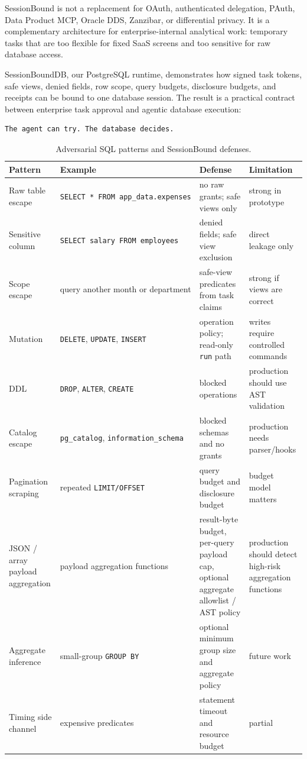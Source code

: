 \documentclass[10pt,twocolumn]{article}
\begin{document}
SessionBound is not a replacement for OAuth, authenticated delegation,
PAuth, Data Product MCP, Oracle DDS, Zanzibar, or differential privacy.
It is a complementary architecture for enterprise-internal analytical
work: temporary tasks that are too flexible for fixed SaaS screens and
too sensitive for raw database access.

SessionBoundDB, our PostgreSQL runtime, demonstrates how signed task
tokens, safe views, denied fields, row scope, query budgets, disclosure
budgets, and receipts can be bound to one database session. The result
is a practical contract between enterprise task approval and agentic
database execution:

\begin{verbatim}
The agent can try. The database decides.
\end{verbatim}

\clearpage

\begin{table}[p]
\centering
\scriptsize
\setlength{\tabcolsep}{3pt}
\caption{Adversarial SQL patterns and SessionBound defenses.}
\label{tab:anti-evasion}
\begin{tabular}{@{}
  >{\raggedright\arraybackslash}p{}
  >{\raggedright\arraybackslash}p{}
  >{\raggedright\arraybackslash}p{}
  >{\raggedright\arraybackslash}p{}@{}}
\toprule
Pattern & Example & Defense & Limitation \\
\midrule
Raw table escape & \texttt{SELECT\ *\ FROM\ app\_data.expenses} & no raw
grants; safe views only & strong in prototype \\
Sensitive column & \texttt{SELECT\ salary\ FROM\ employees} & denied
fields; safe view exclusion & direct leakage only \\
Scope escape & query another month or department & safe-view predicates
from task claims & strong if views are correct \\
Mutation & \texttt{DELETE}, \texttt{UPDATE}, \texttt{INSERT} & operation
policy; read-only \texttt{run} path & writes require controlled
commands \\
DDL & \texttt{DROP}, \texttt{ALTER}, \texttt{CREATE} & blocked
operations & production should use AST validation \\
Catalog escape & \texttt{pg\_catalog}, \texttt{information\_schema} &
blocked schemas and no grants & production needs parser/hooks \\
Pagination scraping & repeated \texttt{LIMIT/OFFSET} & query budget and
disclosure budget & budget model matters \\
JSON / array payload aggregation & payload aggregation functions &
result-byte budget, per-query payload cap, optional aggregate allowlist
/ AST policy & production should detect high-risk aggregation
functions \\
Aggregate inference & small-group \texttt{GROUP\ BY} & optional minimum
group size and aggregate policy & future work \\
Timing side channel & expensive predicates & statement timeout and
resource budget & partial \\
\bottomrule
\end{tabular}
\end{table}
\end{document}
